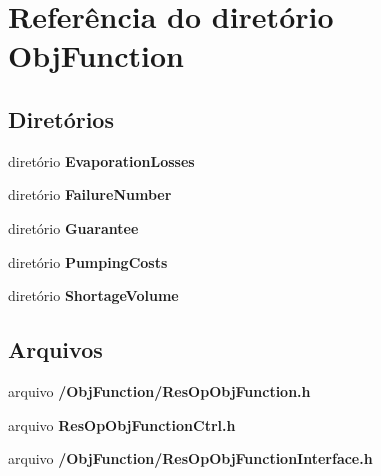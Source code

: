 \section{Referência do diretório Obj\+Function}
\label{dir_8bf16d99e273796b863dee85ead759db}
\subsection*{Diretórios}
\begin{DoxyCompactItemize}
\item 
diretório {\bf Evaporation\+Losses}
\item 
diretório {\bf Failure\+Number}
\item 
diretório {\bf Guarantee}
\item 
diretório {\bf Pumping\+Costs}
\item 
diretório {\bf Shortage\+Volume}
\end{DoxyCompactItemize}
\subsection*{Arquivos}
\begin{DoxyCompactItemize}
\item 
arquivo {\bf /\+Obj\+Function/\+Res\+Op\+Obj\+Function.\+h}
\item 
arquivo {\bf Res\+Op\+Obj\+Function\+Ctrl.\+h}
\item 
arquivo {\bf /\+Obj\+Function/\+Res\+Op\+Obj\+Function\+Interface.\+h}
\end{DoxyCompactItemize}
